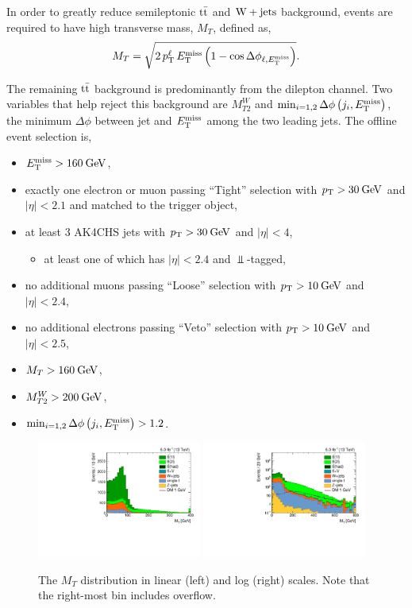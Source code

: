 \clearpage

In order to greatly reduce semileptonic $\mathrm{t}\bar{\mathrm{t}}$ and $\mathrm{W+jets}$ background, events are required to have high transverse mass, $M_T$, defined as,
\begin{equation}
M_T = \sqrt{2\,p_\mathrm{T}^{\ell}\,E_\mathrm{T}^{\mathrm{miss}} \left(1-\cos\Delta\phi_{\ell,E_\mathrm{T}^{\mathrm{miss}}}\right)}.
\end{equation}

The remaining $\mathrm{t}\bar{\mathrm{t}}$ background is predominantly from the dilepton channel. Two variables that help reject this background are $M_{T2}^W$ and $\min_{i=1,2}\Delta\phi\left(j_i,E_\mathrm{T}^{\mathrm{miss}}\right)$, the minimum $\Delta\phi$ between jet and $E_\mathrm{T}^{\mathrm{miss}}$ among the two leading jets. The offline event selection is,
\begin{itemize}
\item $E_\mathrm{T}^{\mathrm{miss}} > 160\:\mathrm{Ge\kern -0.1em V}$,
\item exactly one electron or muon passing ``Tight'' selection with $p_\mathrm{T}>30\:\mathrm{Ge\kern -0.1em V}$ and $|\eta|<2.1$ and matched to the trigger object,
\item at least $3$ AK4CHS jets with $p_\mathrm{T}>30\:\mathrm{Ge\kern -0.1em V}$ and $|\eta|<4$,
  \begin{itemize}
  \item at least one of which has $|\eta|<2.4$ and $\Bot$-tagged,
  \end{itemize}
\item no additional muons passing ``Loose'' selection with $p_\mathrm{T}>10\:\mathrm{Ge\kern -0.1em V}$ and $|\eta|<2.4$,
\item no additional electrons passing ``Veto'' selection with $p_\mathrm{T}>10\:\mathrm{Ge\kern -0.1em V}$ and $|\eta|<2.5$,
\item $M_T > 160\:\mathrm{Ge\kern -0.1em V}$,
\item $M_{T2}^W > 200\:\mathrm{Ge\kern -0.1em V}$,
\item $\min_{i=1,2}\Delta\phi\left(j_i,E_\mathrm{T}^{\mathrm{miss}}\right)>1.2$.
\end{itemize}

\begin{figure}[htbp]
  \centering
  \includegraphics[width=0.48\textwidth]{figures/semilept-incl-mt_l.pdf}
  \includegraphics[width=0.48\textwidth]{figures/semilept-incl-mtlog_l.pdf}
  \caption{The $M_T$ distribution in linear (left) and log (right) scales. Note that the right-most bin includes overflow.}
  \label{fig:incl_semilept_mt}
\end{figure}

